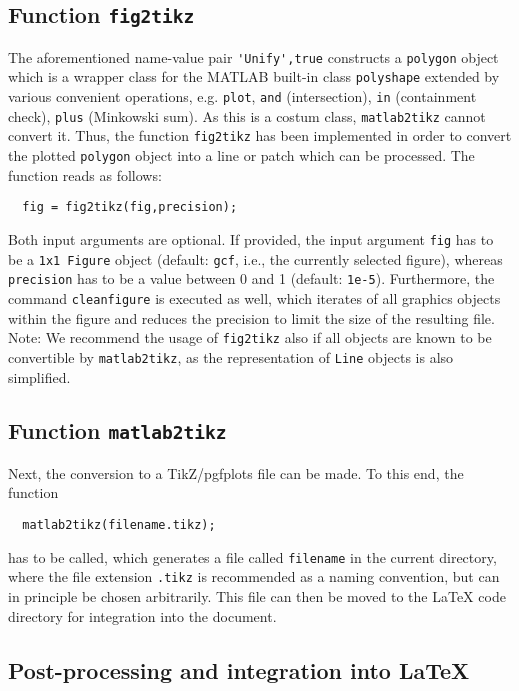 \documentclass{article}
\begin{document}
\subsection{Function \texttt{fig2tikz}}
\label{ssec:fig2tikz}

The aforementioned name-value pair \verb|'Unify',true| constructs a \verb|polygon| object which is a wrapper class for the MATLAB built-in class \verb|polyshape| extended by various convenient operations, e.g. \verb|plot|, \verb|and| (intersection), \verb|in| (containment check), \verb|plus| (Minkowski sum).
As this is a costum class, \verb|matlab2tikz| cannot convert it.
Thus, the function \verb|fig2tikz| has been implemented in order to convert the plotted \verb|polygon| object into a line or patch which can be processed.
The function reads as follows:
%
\begin{verbatim}
  fig = fig2tikz(fig,precision);
\end{verbatim}
%
Both input arguments are optional.
If provided, the input argument \verb|fig| has to be a \verb|1x1 Figure| object (default: \verb|gcf|, i.e., the currently selected figure), whereas \verb|precision| has to be a value between 0 and 1 (default: \verb|1e-5|).
Furthermore, the command \verb|cleanfigure| is executed as well, which iterates of all graphics objects within the figure and reduces the precision to limit the size of the resulting file.
Note: We recommend the usage of \verb|fig2tikz| also if all objects are known to be convertible by \verb|matlab2tikz|, as the representation of \verb|Line| objects is also simplified.

\subsection{Function \texttt{matlab2tikz}}
\label{ssec:matlab2tikz}

Next, the conversion to a TikZ/pgfplots file can be made.
To this end, the function
%
\begin{verbatim}
  matlab2tikz(filename.tikz);
\end{verbatim}
%
has to be called, which generates a file called \verb|filename| in the current directory, where the file extension \verb|.tikz| is recommended as a naming convention, but can in principle be chosen arbitrarily.
This file can then be moved to the LaTeX code directory for integration into the document.

\subsection{Post-processing and integration into LaTeX}
\label{ssec:postprocessing}
\end{document}
